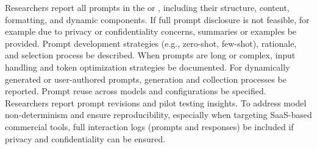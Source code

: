 Researchers \must report all prompts in the \paper or \supplementarymaterial, including their structure, content, formatting, and dynamic components. If full prompt disclosure is not feasible, for example due to privacy or confidentiality concerns, summaries or examples \should be provided. Prompt development strategies (e.g., zero-shot, few-shot), rationale, and selection process \must be described. When prompts are long or complex, input handling and token optimization strategies \must be documented. For dynamically generated or user-authored prompts, generation and collection processes \must be reported. Prompt reuse across models and configurations \must be specified. Researchers \should report prompt revisions and pilot testing insights. To address model non-determinism and ensure reproducibility, especially when targeting SaaS-based commercial tools, full interaction logs (prompts and responses) \should be included if privacy and confidentiality can be ensured.
